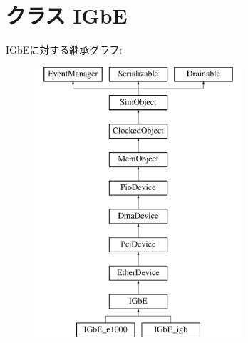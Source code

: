 \hypertarget{classEthernet_1_1IGbE}{
\section{クラス IGbE}
\label{classEthernet_1_1IGbE}
}
IGbEに対する継承グラフ:\begin{figure}[H]
\begin{center}
\leavevmode
\includegraphics[height=10cm]{classEthernet_1_1IGbE}
\end{center}
\end{figure}
